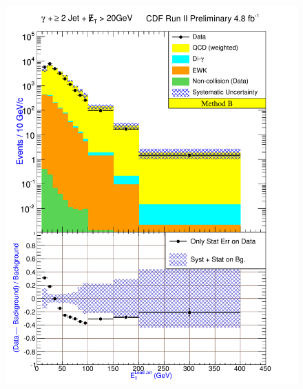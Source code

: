 \documentclass[12pt,twoside,letterpaper,doublespace]{article}
\begin{document}
\begin{figure}[h!]
{\includegraphics[keepaspectratio=true, scale=\figScale]{G30JetsMet20_MtdB_plot2_Et_j1.pdf}}
\label{fig:pjmetMtdBSetTwo}
\end{figure}
\clearpage
\end{document}
